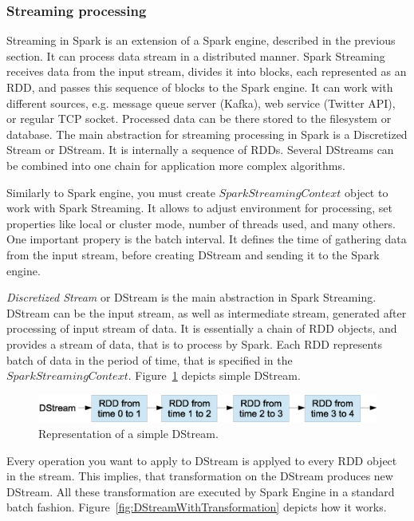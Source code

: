 \subsubsection{Streaming processing}

Streaming in Spark is an extension of a Spark engine, described in the previous section.
It can process data stream in a distributed manner.
Spark Streaming receives data from the input stream, divides it into blocks, each represented as an RDD, and passes this sequence of blocks to the Spark engine.
It can work with different sources, e.g. message queue server (Kafka), web service (Twitter API), or regular TCP socket.
Processed data can be there stored to the filesystem or database.
The main abstraction for streaming processing in Spark is a Discretized Stream or DStream.
It is internally a sequence of RDDs.
Several DStreams can be combined into one chain for application more complex algorithms. 

Similarly to Spark engine, you must create $SparkStreamingContext$ object to work with Spark Streaming.
It allows to adjust environment for processing, set properties like local or cluster mode, number of threads used, and many others.
One important propery is the batch interval.
It defines the time of gathering data from the input stream, before creating DStream and sending it to the Spark engine.

\textit{Discretized Stream}  or DStream is the main abstraction in Spark Streaming.
DStream can be the input stream, as well as intermediate stream, generated after processing of input stream of data.
It is essentially a chain of RDD objects, and provides a stream of data, that is to process by Spark.
Each RDD represents batch of data in the period of time, that is specified in the $SparkStreamingContext$.
Figure~\ref{fig:SimpleDStream} depicts simple DStream.

\begin{figure}[H]
  \centering
  \includegraphics [width=1.0\textwidth]{images/SimpleDStream}
  \caption{Representation of a simple DStream.}
  \label{fig:SimpleDStream}
\end{figure}

Every operation you want to apply to DStream is applyed to every RDD object in the stream.
This implies, that transformation on the DStream produces new DStream.
All these transformation are executed by Spark Engine in a standard batch fashion.
Figure~\ref{fig:DStreamWithTransformation} depicts how it works.


